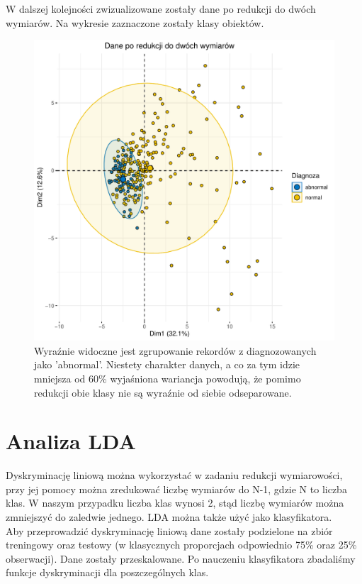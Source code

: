 \documentclass[10pt,a4paper]{article}
\begin{document}
W dalszej kolejności zwizualizowane zostały dane po redukcji do dwóch wymiarów. Na wykresie zaznaczone zostały klasy obiektów.

\begin{figure}[H]
\includegraphics[scale=0.5]{klasy.pdf}
\caption{Wyraźnie widoczne jest zgrupowanie rekordów z diagnozowanych jako 'abnormal'. Niestety charakter danych, a co za tym idzie mniejsza od 60\% wyjaśniona wariancja powodują, że pomimo redukcji obie klasy nie są wyraźnie od siebie odseparowane.}
\end{figure}

\newpage
\section{Analiza LDA}
Dyskryminację liniową można wykorzystać w zadaniu redukcji wymiarowości, przy jej pomocy można zredukować liczbę wymiarów do N-1, gdzie N to liczba klas. W naszym przypadku liczba klas wynosi 2, stąd liczbę wymiarów można zmniejszyć do zaledwie jednego. LDA można także użyć jako klasyfikatora.
\\Aby przeprowadzić dyskryminację liniową dane zostały podzielone na zbiór treningowy oraz testowy (w klasycznych proporcjach odpowiednio 75\% oraz 25\% obserwacji). Dane zostały przeskalowane. Po nauczeniu klasyfikatora zbadaliśmy funkcje dyskryminacji dla poszczególnych klas.
\end{document}
